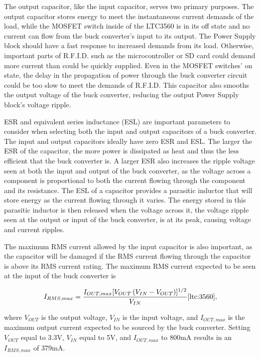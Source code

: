 The output capacitor, like the input capacitor, serves two primary purposes. The output capacitor stores energy to meet the instantaneous current demands of the load, while the MOSFET switch inside of the LTC3560 is in its off state and no current can flow from the buck converter's input to its output. The Power Supply block should have a fast response to increased demands from its load. Otherwise, important parts of R.F.I.D. such as the microcontroller or SD card could demand more current than could be quickly supplied. Even in the MOSFET switches' on state, the delay in the propagation of power through the buck converter circuit could be too slow to meet the demands of R.F.I.D. This capacitor also smooths the output voltage of the buck converter, reducing the output Power Supply block's voltage ripple.  

ESR and equivalent series inductance (ESL) are important parameters to consider when selecting both the input and output capacitors of a buck converter. The input and output capacitors ideally have zero ESR and ESL. The larger the ESR of the capacitor, the more power is dissipated as heat and thus the less efficient that the buck converter is. A larger ESR also increases the ripple voltage seen at both the input and output of the buck converter, as the voltage across a component is proportional to both the current flowing through the component and its resistance. The ESL of a capacitor provides a parasitic inductor that will store energy as the current flowing through it varies. The energy stored in this parasitic inductor is then released when the voltage across it, the voltage ripple seen at the output or input of the buck converter, is at its peak, causing voltage and current ripples. 

The maximum RMS current allowed by the input capacitor is also important, as the capacitor will be damaged if the RMS current flowing through the capacitor is above its RMS current rating. The maximum RMS current expected to be seen at the input of the buck converter is  

\begin{equation}
\label{eq:rms_max}
    I_{RMS,max} = \frac{I_{OUT,max}[V_{OUT}\left(V_{IN}-V_{OUT}\right)]^{1/2}}{V_{IN}} \cite{ltc:3560},
\end{equation}

where $V_{OUT}$ is the output voltage, $V_{IN}$ is the input voltage, and $I_{OUT,max}$ is the maximum output current expected to be sourced by the buck converter. Setting $V_{OUT}$ equal to 3.3V, $V_{IN}$ equal to 5V, and $I_{OUT,max}$ to 800mA results in an $I_{RMS,max}$ of 379mA. 

